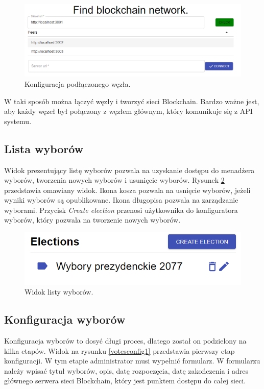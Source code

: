 \documentclass[a4paper,12pt]{book}
\begin{document}
\begin{figure}[h]
	\centering
	\includegraphics[width=\textwidth]{images/ndoeconfig.png}
	\caption{Konfiguracja podłączonego węzła.}\label{nodeconfig}
\end {figure}

W taki sposób można łączyć węzły i tworzyć sieci Blockchain. Bardzo ważne jest, aby każdy węzeł był połączony z węzłem głównym, który komunikuje się z API systemu.

\subsection{Lista wyborów}

Widok prezentujący listę wyborów pozwala na uzyskanie dostępu do menadżera wyborów, tworzenia nowych wyborów i usunięcie wyborów. Rysunek \ref{electionlist} przedstawia omawiany widok. Ikona kosza pozwala na usnięcie wyborów, jeżeli wyniki wyborów są opublikowane. Ikona długopisa pozwala na zarządzanie wyborami. Przycisk \textit{Create election} przenosi użytkownika do konfiguratora wyborów, który pozwala na tworzenie nowych wyborów.

\begin{figure}[h]
	\centering
	\includegraphics[width=\textwidth]{images/electionlist.png}
	\caption{Widok listy wyborów.}\label{electionlist}
\end {figure}

\subsection{Konfiguracja wyborów}

Konfiguracja wyborów to dosyć długi proces, dlatego został on podzielony na kilka etapów. Widok na rysunku \ref{votesconfig1} przedstawia pierwszy etap konfiguracji. W tym etapie administrator musi wypełnić formularz. W formularzu należy wpisać tytuł wyborów, opis, datę rozpoczęcia, datę zakończenia i adres głównego serwera sieci Blockchain, który jest punktem dostępu do całej sieci.
\end{document}
